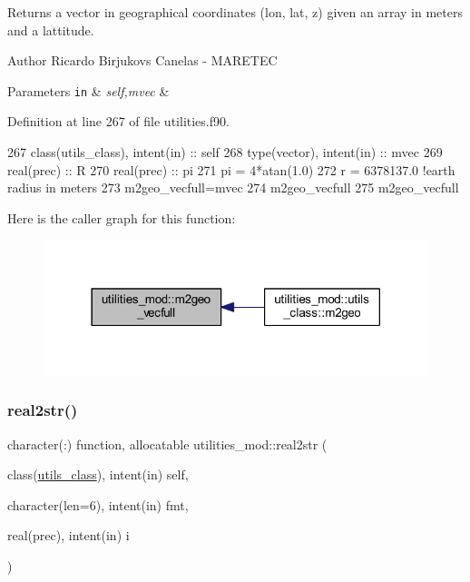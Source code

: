 Returns a vector in geographical coordinates (lon, lat, z) given an array in meters and a lattitude. 

\begin{DoxyAuthor}{Author}
Ricardo Birjukovs Canelas -\/ M\+A\+R\+E\+T\+EC 
\end{DoxyAuthor}

\begin{DoxyParams}[1]{Parameters}
\mbox{\tt in}  & {\em self,mvec} & \\
\hline
\end{DoxyParams}


Definition at line 267 of file utilities.\+f90.


\begin{DoxyCode}
267     \textcolor{keywordtype}{class}(utils\_class), \textcolor{keywordtype}{intent(in)} :: self
268     \textcolor{keywordtype}{type}(vector), \textcolor{keywordtype}{intent(in)} :: mvec
269     \textcolor{keywordtype}{real(prec)} :: R
270     \textcolor{keywordtype}{real(prec)} :: pi
271     pi = 4*atan(1.0)
272     r = 6378137.0 \textcolor{comment}{!earth radius in meters}
273     m2geo\_vecfull=mvec
274     m2geo\_vecfull%
275     m2geo\_vecfull%
\end{DoxyCode}
Here is the caller graph for this function\+:\nopagebreak
\begin{figure}[H]
\begin{center}
\leavevmode
\includegraphics[width=318pt]{namespaceutilities__mod_a0b374564c3672b029cc10d238bf77d4b_icgraph}
\end{center}
\end{figure}
\mbox{\label{namespaceutilities__mod_a2c8481f2b9f4cddf8391bd1e8b624335}} 
\subsubsection{\texorpdfstring{real2str()}{real2str()}}
{\footnotesize\ttfamily character(\+:) function, allocatable utilities\+\_\+mod\+::real2str (\begin{DoxyParamCaption}\item[{class(\mbox{\hyperlink{structutilities__mod_1_1utils__class}{utils\+\_\+class}}), intent(in)}]{self,  }\item[{character(len=6), intent(in)}]{fmt,  }\item[{real(prec), intent(in)}]{i }\end{DoxyParamCaption})\hspace{0.3cm}{\ttfamily [private]}}



